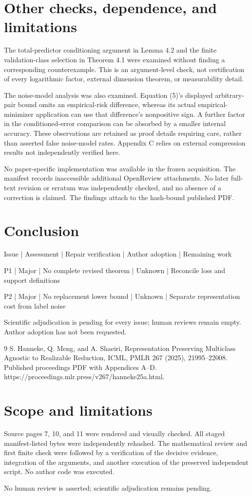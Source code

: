 \documentclass[10pt]{article}
\begin{document}
\section*{Other checks, dependence, and limitations}
The total-predictor conditioning argument in Lemma 4.2 and the finite validation-class selection in Theorem 4.1 were examined without finding a corresponding counterexample. This is an argument-level check, not certification of every logarithmic factor, external dimension theorem, or measurability detail.\par
The noise-model analysis was also examined. Equation (5)’s displayed arbitrary-pair bound omits an empirical-risk difference, whereas its actual empirical-minimizer application can use that difference’s nonpositive sign. A further factor in the conditioned-error comparison can be absorbed by a smaller internal accuracy. These observations are retained as proof details requiring care, rather than asserted false noise-model rates. Appendix C relies on external compression results not independently verified here.\par
No paper-specific implementation was available in the frozen acquisition. The manifest records inaccessible additional OpenReview attachments. No later full-text revision or erratum was independently checked, and no absence of a correction is claimed. The findings attach to the hash-bound published PDF.\par
\section*{Conclusion}
Issue | Assessment | Repair verification | Author adoption | Remaining work\par
P1 | Major | No complete revised theorem | Unknown | Reconcile loss and support definitions\par
P2 | Major | No replacement lower bound | Unknown | Separate representation cost from label noise\par
Scientific adjudication is pending for every issue; human reviews remain empty. Author adoption has not been requested.\par
9 S. Hanneke, Q. Meng, and A. Shaeiri, Representation Preserving Multiclass Agnostic to Realizable Reduction, ICML, PMLR 267 (2025), 21995–22008. Published proceedings PDF with Appendices A–D. https://proceedings.mlr.press/v267/hanneke25a.html.\par
\section*{Scope and limitations}
Source pages 7, 10, and 11 were rendered and visually checked. All staged manifest-listed bytes were independently rehashed. The mathematical review and first finite check were followed by a verification of the decisive evidence, integration of the arguments, and another execution of the preserved independent script. No author code was executed.\par
No human review is asserted; scientific adjudication remains pending.\par
\end{document}
